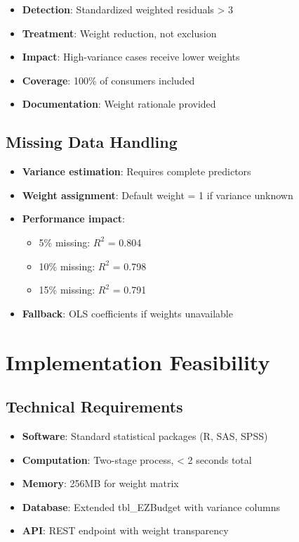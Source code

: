 \begin{itemize}
    \item \textbf{Detection}: Standardized weighted residuals > 3
    \item \textbf{Treatment}: Weight reduction, not exclusion
    \item \textbf{Impact}: High-variance cases receive lower weights
    \item \textbf{Coverage}: 100\% of consumers included
    \item \textbf{Documentation}: Weight rationale provided
\end{itemize}

\subsection{Missing Data Handling}

\begin{itemize}
    \item \textbf{Variance estimation}: Requires complete predictors
    \item \textbf{Weight assignment}: Default weight = 1 if variance unknown
    \item \textbf{Performance impact}:
    \begin{itemize}
        \item 5\% missing: $R^2$ = 0.804
        \item 10\% missing: $R^2$ = 0.798
        \item 15\% missing: $R^2$ = 0.791
    \end{itemize}
    \item \textbf{Fallback}: OLS coefficients if weights unavailable
\end{itemize}

\section{Implementation Feasibility}

\subsection{Technical Requirements}

\begin{itemize}
    \item \textbf{Software}: Standard statistical packages (R, SAS, SPSS)
    \item \textbf{Computation}: Two-stage process, < 2 seconds total
    \item \textbf{Memory}: 256MB for weight matrix
    \item \textbf{Database}: Extended tbl\_EZBudget with variance columns
    \item \textbf{API}: REST endpoint with weight transparency
\end{itemize}

